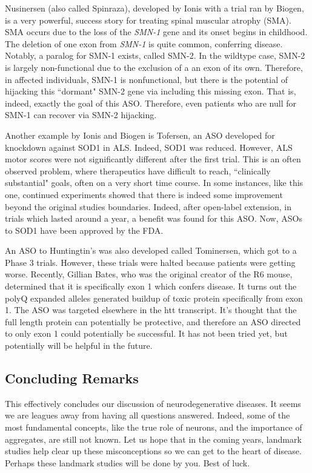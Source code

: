 Nusinersen (also called Spinraza), developed by Ionis with a trial ran by Biogen, is a very powerful, success story for treating spinal muscular atrophy (SMA). SMA occurs due to the loss of the \textit{SMN-1} gene and its onset begins in childhood. The deletion of one exon from \textit{SMN-1} is quite common, conferring disease. Notably, a paralog for SMN-1 exists, called SMN-2. In the wildtype case, SMN-2 is largely non-functional due to the exclusion of a an exon of its own. Therefore, in affected individuals, SMN-1 is nonfunctional, but there is the potential of hijacking this ``dormant" SMN-2 gene via including this missing exon. That is, indeed, exactly the goal of this ASO. Therefore, even patients who are null for SMN-1 can recover via SMN-2 hijacking.\newline

Another example by Ionis and Biogen is Tofersen, an ASO developed for knockdown against SOD1 in ALS. Indeed, SOD1 was reduced. However, ALS motor scores were not significantly different after the first trial. This is an often observed problem, where therapeutics have difficult to reach, ``clinically substantial" goals, often on a very short time course. In some instances, like this one, continued experiments showed that there is indeed some improvement beyond the original studies boundaries. Indeed, after open-label extension, in trials which lasted around a year, a benefit was found for this ASO. Now, ASOs to SOD1 have been approved by the FDA.\newline

An ASO to Huntingtin's was also developed called Tominersen, which got to a Phase 3 trials. However, these trials were halted because patients were getting worse. Recently, Gillian Bates, who was the original creator of the R6 mouse, determined that it is specifically exon 1 which confers disease. It turns out the polyQ expanded alleles generated buildup of toxic protein specifically from exon 1. The ASO was targeted elsewhere in the htt transcript. It's thought that the full length protein can potentially be protective, and therefore an ASO directed to only exon 1 could potentially be successful. It has not been tried yet, but potentially will be helpful in the future. 


\subsection*{Concluding Remarks}

This effectively concludes our discussion of neurodegenerative diseases. It seems we are leagues away from having all questions answered. Indeed, some of the most fundamental concepts, like the true role of neurons, and the importance of aggregates, are still not known. Let us hope that in the coming years, landmark studies help clear up these misconceptions so we can get to the heart of disease. Perhaps these landmark studies will be done by you. Best of luck. 


